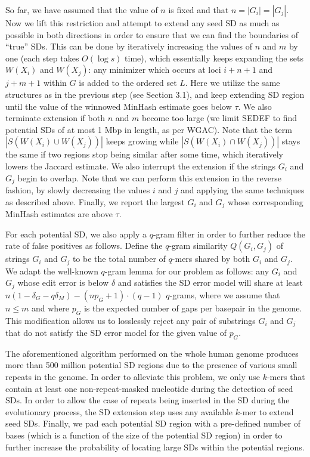 \documentclass{article}
\begin{document}
So far, we have assumed that the value of $n$ is fixed and that $n=|G_{i}|=|G_{j}|$. Now we lift this restriction and attempt to extend any seed SD as much as possible in both directions in order to ensure that we can find the boundaries of ``true'' SDs. 
This can be done by iteratively increasing the values of $n$ and $m$ by one (each step takes $O(\log s)$ time), which essentially keeps expanding the sets $W(X_i)$ and $W(X_j)$: any minimizer which occurs at loci $i+n+1$ and $j+m+1$ within $G$ is added to the ordered set $L$. Here we utilize the same structures as in the previous step (see Section 3.1), and keep extending SD region until the value of the winnowed MinHash estimate goes below $\tau$. We also terminate extension if both $n$ and $m$ become too large (we limit SEDEF to find potential SDs of at most 1 Mbp in length, as per WGAC). 
Note that the term $|S(W(X_i) \cup W(X_j))|$ keeps growing while $|S(W(X_i) \cap W(X_j))|$ stays the same if two regions stop being similar after some time, which iteratively lowers the Jaccard estimate.
We also interrupt the extension if the strings $G_{i}$ and $G_{j}$ begin to overlap. Note that we can perform this extension in the reverse fashion, by slowly decreasing the values $i$ and $j$ and applying the same techniques as described above. Finally, we report the largest $G_{i}$ and $G_{j}$ whose corresponding MinHash estimates are above $\tau$.

For each potential SD, we also apply a $q$-gram filter \citep{Jokinen1991} in order to further reduce the rate of false positives as follows. Define the $q$-gram similarity $Q(G_i, G_j)$ of strings $G_i$ and $G_j$ to be the total number of $q$-mers shared by both $G_i$ and $G_j$. We adapt the well-known $q$-gram lemma for our problem as follows: any $G_i$ and $G_j$ whose edit error is below $\delta$ and satisfies the SD error model will share at least $n (1 - \delta_G - q\delta_M ) - (np_G + 1) \cdot (q - 1)$
$q$-grams, where we assume that $n\leq m$ and where $p_G$ is the expected number of gaps per basepair in the genome. This modification allows us to losslessly reject any pair of substrings $G_i$ and $G_j$ that do not satisfy the SD error model for the given value of $p_G$. %

The aforementioned algorithm performed on the whole human genome produces more than 500 million potential SD regions due to the presence of various small repeats in the genome. In order to alleviate this problem, we only use $k$-mers that contain at least one non-repeat-masked nucleotide during the detection of seed SDs. In order to allow the case of repeats being inserted in the SD during the evolutionary process, the SD extension step uses any available $k$-mer to extend seed SDs. Finally, we pad each potential SD region with a pre-defined number of bases (which is a function of the size of the potential SD region) in order to further increase the probability of locating large SDs within the potential regions.
\end{document}
